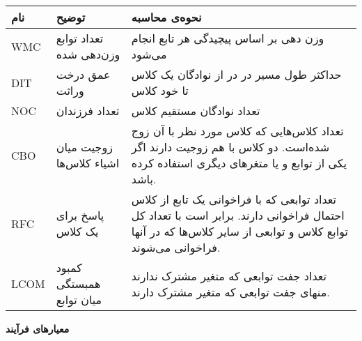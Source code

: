\begin{itemize}
\begin{table}[H]
\begin{tabular}{|C{2cm}|C{3cm}|C{8cm}|}
 		\hline
 		\hline
 		نام & توضیح & نحوه‌ی محاسبه \\
 		\hline
 		\hline
 		WMC &
 		تعداد توابع وزن‌دهی شده & وزن دهی بر اساس پیچیدگی هر تابع انجام می‌شود \\
 		\hline
DIT & 
عمق درخت وراثت & حداکثر طول مسیر در در از نوادگان یک کلاس تا خود کلاس\\
\hline
NOC &
تعداد فرزندان & تعداد نوادگان مستقیم کلاس\\
\hline
CBO & 
زوجیت میان اشیاء کلاس‌ها & تعداد کلاس‌هایی که کلاس مورد نظر با آن زوج شده‌است. دو کلاس با هم زوجیت دارند اگر یکی از توابع و یا متغر‌های دیگری استفاده کرده باشد. \\
\hline
RFC &
پاسخ برای یک کلاس & تعداد توابعی که با فراخوانی یک تابع از کلاس احتمال فراخوانی دارند. برابر است با تعداد کل توابع کلاس و توابعی از سایر کلاس‌ها که در آنها فراخوانی می‌شوند. \\
\hline
LCOM & 
کمبود همبستگی میان توابع & تعداد جفت توابعی که متغیر مشترک ندارند منهای جفت توابعی که متغیر مشترک دارند. \\
 		
 		\hline

\end{tabular}
\end{table}

\end{itemize}
\textbf{معیارهای فرآیند} \\


